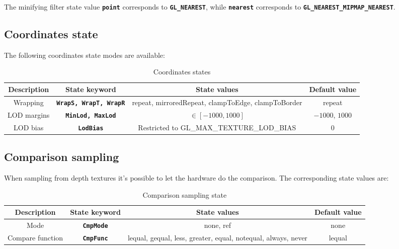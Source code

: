 \documentclass[11pt,a4paper,final,titlepage]{article}
\newcommand{\slp}{\left[}
\newcommand{\srp}{\right]}
\begin{document}
The minifying filter state value \texttt{\textbf{point}} corresponds to \texttt{\textbf{GL\_\-NEAREST}},
while \texttt{\textbf{nearest}} corresponds to \texttt{\textbf{GL\_\-NEAREST\_\-MIPMAP\_\-NEAREST}}.

\subsection{Coordinates state}
The following coordinates state modes are available:
\begin{table}[h]
\centering
\begin{tabulary}{\linewidth}{|C|C|C|C|}
\hline
Description & State keyword & State values & Default value\\
\hline\hline
Wrapping & \texttt{\textbf{WrapS, WrapT, WrapR}} &
repeat, mirroredRepeat, clampToEdge, clampToBorder & repeat\\
\hline
LOD margins & \texttt{\textbf{MinLod, MaxLod}} & $\in\slp-1000,1000\srp$ & $-1000$, $1000$\\
\hline
LOD bias & \texttt{\textbf{LodBias}} & Restricted to GL\_MAX\_TEXTURE\_LOD\_BIAS & 0\\
\hline
\end{tabulary}
\caption{Coordinates states}
\label{tab:coordModes}
\end{table}

\subsection{Comparison sampling}
When sampling from depth textures it's possible to let the hardware do the comparison.
The corresponding state values are:
\begin{table}[h]
\centering
\begin{tabulary}{\linewidth}{|C|C|C|C|}
\hline
Description & State keyword & State values & Default value\\
\hline\hline
Mode & \texttt{\textbf{CmpMode}} & none, ref & none\\
\hline
Compare function & \texttt{\textbf{CmpFunc}} &
lequal, gequal, less, greater, equal, notequal, always, never & lequal\\
\hline
\end{tabulary}
\caption{Comparison sampling state}
\label{tab:compModes}
\end{table}
\end{document}
